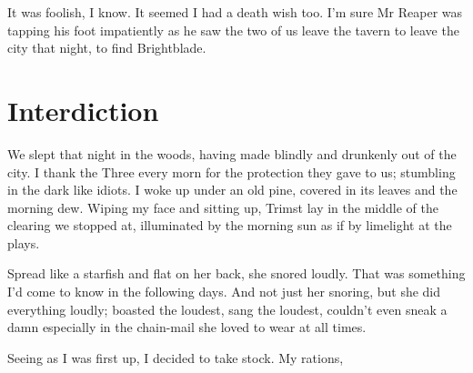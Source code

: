 \documentclass[12pt, a4paper]{book}
\begin{document}
It was foolish, I know. It seemed I had a death wish too. I'm sure Mr Reaper was tapping his foot impatiently as he saw the two of us leave the tavern to leave the city that night, to find Brightblade.

\chapter{Interdiction}

We slept that night in the woods, having made blindly and drunkenly out of the city. I thank the Three every morn for the protection they gave to us; stumbling in the dark like idiots. I woke up under an old pine, covered in its leaves and the morning dew. Wiping my face and sitting up, Trimst lay in the middle of the clearing we stopped at, illuminated by the morning sun as if by limelight at the plays.

Spread like a starfish and flat on her back, she snored loudly. That was something I'd come to know in the following days. And not just her snoring, but she did everything loudly; boasted the loudest, sang the loudest, couldn't even sneak a damn especially in the chain-mail she loved to wear at all times.

Seeing as I was first up, I decided to take stock. My rations, 
\end{document}
